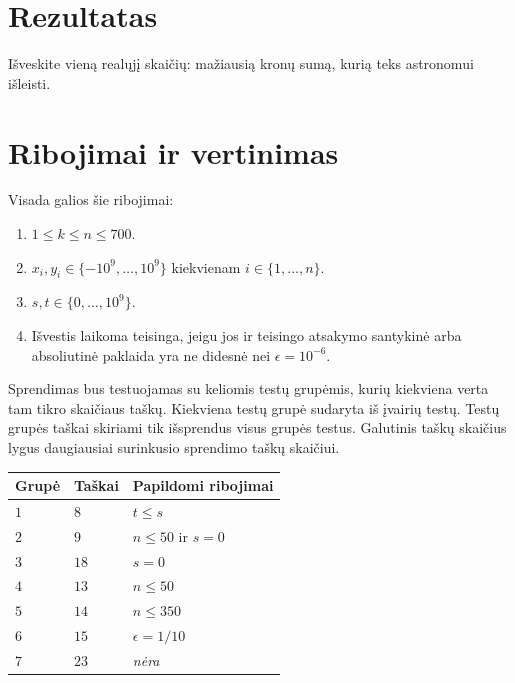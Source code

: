 \section*{Rezultatas}

Išveskite vieną realųjį skaičių: mažiausią kronų sumą, kurią teks astronomui išleisti.

\section*{Ribojimai ir vertinimas}

Visada galios šie ribojimai:
\begin{enumerate}
\item $1\leq k\leq n\leq 700$. %
\item $x_i, y_i\in \{-10^9,\ldots, 10^9\}$ kiekvienam $i\in\{1,\ldots,n\}$. %
\item $s,t\in \{0,\ldots, 10^9\}$. %
\item Išvestis laikoma teisinga, jeigu jos ir teisingo atsakymo
santykinė arba absoliutinė paklaida yra ne didesnė nei $\epsilon = 10^{-6}$.
\end{enumerate}

Sprendimas bus testuojamas su keliomis testų grupėmis, kurių kiekviena verta tam tikro skaičiaus taškų.
Kiekviena testų grupė sudaryta iš įvairių testų.
Testų grupės taškai skiriami tik išsprendus visus grupės testus.
Galutinis taškų skaičius lygus daugiausiai surinkusio sprendimo taškų skaičiui.

\medskip
\noindent
\begin{tabular}{lll}
  Grupė & Taškai & Papildomi ribojimai\\\hline
  $1$ & $8$ &  $t\leq s$\\
  $2$ & $9$ & $n\le 50$ ir $s=0$\\
  $3$ & $18$ & $s=0$\\
  $4$ & $13$ & $n\leq 50$\\
  $5$ & $14$ & $n\leq 350$\\
  $6$ & $15$ & $\epsilon = 1/10$\\
  $7$ & $23$ & \emph{nėra}\\
\end{tabular}
